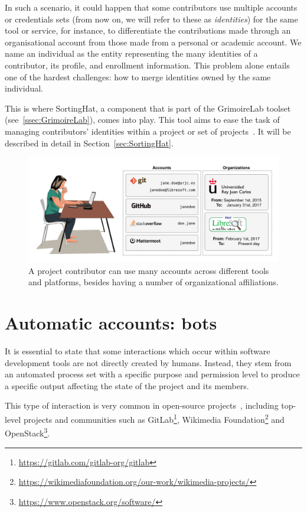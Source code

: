 \documentclass[a4paper, 12pt]{book}
\begin{document}
In such a scenario, it could happen that some contributors use multiple accounts or credentials sets (from now on, we will refer to these as \textit{identities}) for the same tool or service, for instance, to differentiate the contributions made through an organisational account from those made from a personal or academic account. We name an individual as the entity representing the many identities of a contributor, its profile, and enrollment information. This problem alone entails one of the hardest challenges: how to merge identities owned by the same individual.

This is where SortingHat, a component that is part of the GrimoireLab toolset (see~\ref{ssec:GrimoireLab}), comes into play. This tool aims to ease the task of managing contributors' identities within a project or set of projects~\cite{moreno_et_al-sortinghat}. It will be described in detail in Section~\ref{sec:SortingHat}. 

\begin{figure}
 \centering
  \includegraphics[width=16cm, keepaspectratio]{img/example-identity}
  \caption{A project contributor can use many accounts across different tools and platforms, besides having a number of organizational affiliations.}
  \label{fig:example-identity}
\end{figure}

\section{Automatic accounts: bots}
\label{sec:intro-bots}

It is essential to state that some interactions which occur within software development tools are not directly created by humans. Instead, they stem from an automated process set with a specific purpose and permission level to produce a specific output affecting the state of the project and its members.

This type of interaction is very common in open-source projects~\cite{erlenhov-et-al-emprirical-study-bots-oss20}, including top-level projects and communities such as GitLab\footnote{\url{https://gitlab.com/gitlab-org/gitlab}}, Wikimedia Foundation\footnote{\url{https://wikimediafoundation.org/our-work/wikimedia-projects/}} and OpenStack\footnote{\url{https://www.openstack.org/software/}}.
\end{document}
